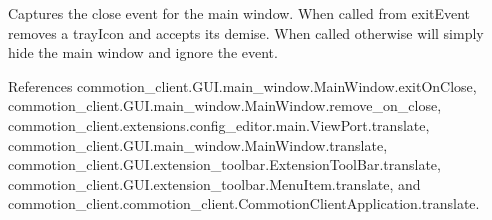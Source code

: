 \begin{DoxyVerb}Captures the close event for the main window. When called from exitEvent removes a trayIcon and accepts its demise. When called otherwise will simply hide the main window and ignore the event.
\end{DoxyVerb}
 

References commotion\-\_\-client.\-G\-U\-I.\-main\-\_\-window.\-Main\-Window.\-exit\-On\-Close, commotion\-\_\-client.\-G\-U\-I.\-main\-\_\-window.\-Main\-Window.\-remove\-\_\-on\-\_\-close, commotion\-\_\-client.\-extensions.\-config\-\_\-editor.\-main.\-View\-Port.\-translate, commotion\-\_\-client.\-G\-U\-I.\-main\-\_\-window.\-Main\-Window.\-translate, commotion\-\_\-client.\-G\-U\-I.\-extension\-\_\-toolbar.\-Extension\-Tool\-Bar.\-translate, commotion\-\_\-client.\-G\-U\-I.\-extension\-\_\-toolbar.\-Menu\-Item.\-translate, and commotion\-\_\-client.\-commotion\-\_\-client.\-Commotion\-Client\-Application.\-translate.


